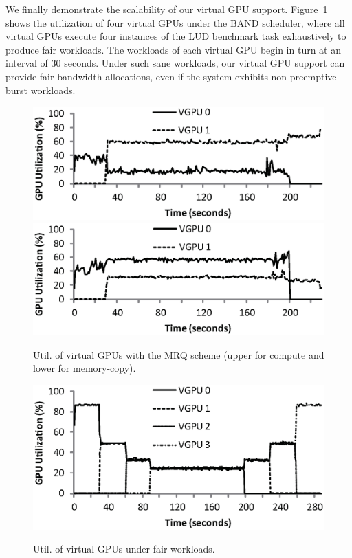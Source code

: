 We finally demonstrate the scalability of our virtual GPU support.
Figure~\ref{fig:vgpu_fair_4_band} shows the utilization of four virtual
GPUs under the BAND scheduler, where all virtual GPUs execute four
instances of the LUD benchmark task exhaustively to produce fair
workloads.
The workloads of each virtual GPU begin in turn at an interval of 30
seconds.
Under such sane workloads, our virtual GPU support can provide fair
bandwidth allocations, even if the system exhibits non-preemptive burst
workloads.

\begin{figure}[t]
 \begin{center}
  \includegraphics[width=0.9\hsize]{eps/vgpu_2_band_compute.eps}\\
  \vspace{-0.5em}
  \includegraphics[width=0.9\hsize]{eps/vgpu_2_band_memory.eps}\\
  \vspace{-1.5em}
  \caption{Util. of virtual GPUs with the MRQ scheme (upper for compute
  and lower for memory-copy).}
  \label{fig:vgpu_2_band_mrq}
 \end{center}
 \begin{center}
  \includegraphics[width=0.9\hsize]{eps/vgpu_fair_4_band.eps}\\
  \vspace{-1.5em}
  \caption{Util. of virtual GPUs under fair workloads.}
  \label{fig:vgpu_fair_4_band}
 \end{center}
  \vspace{-1.5em}
\end{figure}
